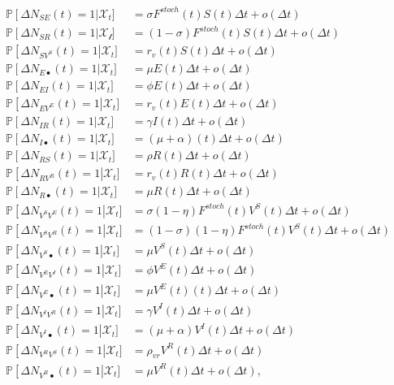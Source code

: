 \begin{gather}
\label{eq:stochsys}
\begin{aligned}
    \mathbb{P}\left[ \Delta N_{SE}(t) = 1 \right|\mathcal{X}_t] &= \sigma F^{stoch}(t) S(t) \Delta t + o(\Delta t)\\
    \mathbb{P}\left[ \Delta N_{SR}(t) = 1 \right|\mathcal{X_t}] &= (1-\sigma) F^{stoch}(t) S(t) \Delta t + o(\Delta t)\\
    \mathbb{P}\left[ \Delta N_{SV^S}(t) = 1 \right|\mathcal{X}_t] &= r_v(t) S(t) \Delta t + o(\Delta t)\\
    \mathbb{P}\left[ \Delta N_{E\bullet}(t) = 1 \right|\mathcal{X}_t] &= \mu  E(t) \Delta t + o(\Delta t)\\
    \mathbb{P}\left[ \Delta N_{EI}(t) = 1 \right|\mathcal{X}_t] &= \phi E(t) \Delta t + o(\Delta t)\\
    \mathbb{P}\left[ \Delta N_{EV^E}(t) = 1 \right|\mathcal{X}_t] &= r_v(t) E(t) \Delta t + o(\Delta t)\\
    \mathbb{P}\left[ \Delta N_{IR}(t) = 1 \right|\mathcal{X}_t] &= \gamma I(t) \Delta t + o(\Delta t)\\
    \mathbb{P}\left[ \Delta N_{I\bullet}(t) = 1 \right|\mathcal{X}_t] &= (\mu+\alpha)(t) \Delta t + o(\Delta t)\\
    \mathbb{P}\left[ \Delta N_{RS}(t) = 1 \right|\mathcal{X}_t] &= \rho R(t) \Delta t + o(\Delta t)\\
    \mathbb{P}\left[ \Delta N_{RV^R}(t) = 1 \right|\mathcal{X}_t] &= r_v(t) R(t) \Delta t + o(\Delta t)\\
    \mathbb{P}\left[ \Delta N_{R\bullet}(t) = 1 \right|\mathcal{X}_t] &= \mu R(t) \Delta t + o(\Delta t)\\
    \mathbb{P}\left[ \Delta N_{V^SV^E}(t) = 1 \right|\mathcal{X}_t] &=  \sigma (1-\eta) F^{stoch}(t) V^S(t) \Delta t + o(\Delta t)\\
    \mathbb{P}\left[ \Delta N_{V^SV^R}(t) = 1 \right|\mathcal{X}_t] &=  (1-\sigma) (1-\eta) F^{stoch}(t) V^S(t) \Delta t + o(\Delta t)\\
    \mathbb{P}\left[ \Delta N_{V^S\bullet}(t) = 1 \right|\mathcal{X}_t] &= \mu V^S(t) \Delta t + o(\Delta t)\\
    \mathbb{P}\left[ \Delta N_{V^EV^I}(t) = 1 \right|\mathcal{X}_t] &= \phi V^E(t) \Delta t + o(\Delta t)\\
    \mathbb{P}\left[ \Delta N_{V^E\bullet}(t) = 1 \right|\mathcal{X}_t] &= \mu V^E(t)(t) \Delta t + o(\Delta t)\\
    \mathbb{P}\left[ \Delta N_{V^IV^R}(t) = 1 \right|\mathcal{X}_t] &= \gamma V^I(t) \Delta t + o(\Delta t)\\
    \mathbb{P}\left[ \Delta N_{V^I\bullet}(t) = 1 \right|\mathcal{X}_t] &= (\mu+\alpha)V^I(t) \Delta t + o(\Delta t)\\
    \mathbb{P}\left[ \Delta N_{V^RV^S}(t) = 1 \right|\mathcal{X}_t] &= \rho_{vr} V^R(t) \Delta t + o(\Delta t)\\
    \mathbb{P}\left[ \Delta N_{V^R\bullet}(t) = 1 \right|\mathcal{X}_t] &= \mu V^R(t) \Delta t + o(\Delta t),\\
\end{aligned}
\end{gather}

